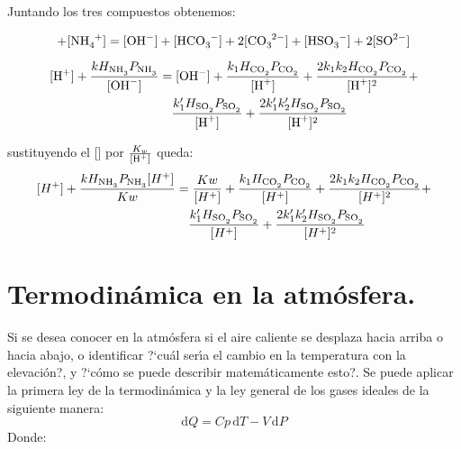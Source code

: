 Juntando los tres compuestos obtenemos:

\begin{equation*}
[H^+] + [\ce{NH4+}] = [\ce{OH-}]+[\ce{HCO3-}]+2[\ce{CO3^{2-}}]+[\ce{HSO3-}]+2[\ce{SO^{2-}}]
\end{equation*}

 \begin{equation*}
\begin{split}
[\ce{H+}] + \frac{kH_{\ce{NH3}}P_{\ce{NH3}}}{[\ce{OH-}]} &= [\ce{OH-}] + \frac{k_1H_{\ce{CO2}}P_{\ce{CO2}}}{[\ce{H+}]} +\frac{2k_1k_2H_{\ce{CO2}}P_{\ce{CO2}}}{[\ce{H+}]^2} + \\
&\quad\frac{k'_1H_{\ce{SO2}}P_{\ce{SO2}}} {[\ce{H+}]} + \frac{2k'_1k'_2H_{\ce{SO2}}P_{\ce{SO2}}}{[\ce{H+}]^2}
\end{split}
\end{equation*}

sustituyendo el []  por  $\frac{K_w}{[\ce{H+}]} $ queda: 
 \begin{equation*}
\begin{split}
[H^+] + \frac{kH_{\ce{NH3}}P_{\ce{NH3}}[H^+]}{Kw} &= \frac{Kw}{[H^+]} + \frac{k_1H_{\ce{CO2}}P_{\ce{CO2}}}{[H^+]} +\frac{2k_1k_2H_{\ce{CO2}}P_{\ce{CO2}}}{[H^+]^2} +\\ &\quad\frac{k'_1H_{\ce{SO2}}P_{\ce{SO2}}} {[H^+]} + \frac{2k'_1k'_2H_{\ce{SO2}}P_{\ce{SO2}}}{[H^+]^2}
\end{split}
\end{equation*}

\section{Termodin\'amica en la atm\'osfera.}

Si se desea conocer en la atm\'osfera si  el aire caliente se desplaza hacia arriba o hacia abajo, o identificar 
?`cu\'al ser\'{\i}a el cambio en la temperatura con la elevaci\'on?, y ?`c\'omo se puede describir matem\'aticamente esto?. Se puede aplicar  la primera ley de la termodin\'amica y la ley general de los gases ideales de la siguiente manera:
\begin{equation}
\mathrm{d}Q =Cp\,\mathrm{d}T -V\,\mathrm{d}P
\end{equation}
Donde:

